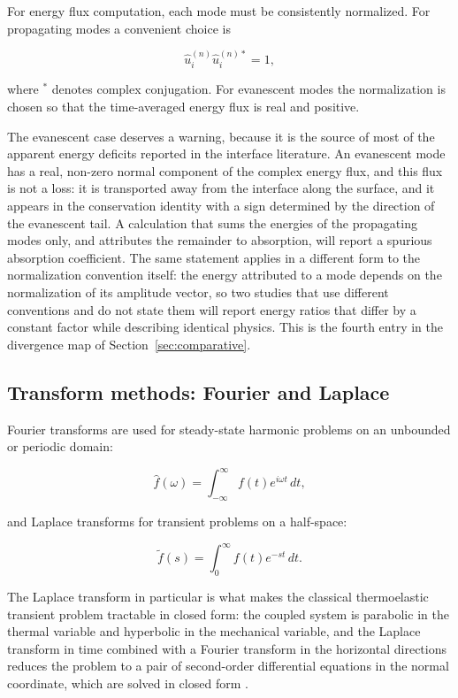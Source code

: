 For energy flux computation, each mode must be consistently normalized. For propagating modes a convenient choice is

\begin{equation}
\hat{u}_i^{(n)} \hat{u}_i^{(n)*} = 1,
\label{eq:8.5}
\end{equation}

where $^{*}$ denotes complex conjugation. For evanescent modes the normalization is chosen so that the time-averaged energy flux is real and positive.

The evanescent case deserves a warning, because it is the source of most of the apparent energy deficits reported in the interface literature. An evanescent mode has a real, non-zero normal component of the complex energy flux, and this flux is not a loss: it is transported away from the interface along the surface, and it appears in the conservation identity with a sign determined by the direction of the evanescent tail. A calculation that sums the energies of the propagating modes only, and attributes the remainder to absorption, will report a spurious absorption coefficient. The same statement applies in a different form to the normalization convention itself: the energy attributed to a mode depends on the normalization of its amplitude vector, so two studies that use different conventions and do not state them will report energy ratios that differ by a constant factor while describing identical physics. This is the fourth entry in the divergence map of Section~\ref{sec:comparative}.

\subsection{Transform methods: Fourier and Laplace}
\label{sec:8.6}

Fourier transforms are used for steady-state harmonic problems on an unbounded or periodic domain:

\begin{equation}
\hat{f}(\omega) = \int_{-\infty}^{\infty} f(t) e^{i\omega t}\,dt,
\label{eq:8.6}
\end{equation}

and Laplace transforms for transient problems on a half-space:

\begin{equation}
\tilde{f}(s) = \int_0^{\infty} f(t) e^{-st}\,dt.
\label{eq:8.7}
\end{equation}

The Laplace transform in particular is what makes the classical thermoelastic transient problem tractable in closed form: the coupled system is parabolic in the thermal variable and hyperbolic in the mechanical variable, and the Laplace transform in time combined with a Fourier transform in the horizontal directions reduces the problem to a pair of second-order differential equations in the normal coordinate, which are solved in closed form \cite{Achenbach1973,Nowacki1975}.

